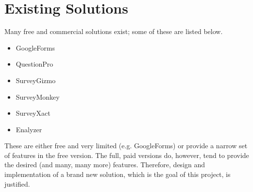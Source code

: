 \section{Existing Solutions}
\label{sec:existingsolutions}
Many free and commercial solutions exist; some of these are listed below.
\begin{itemize}
\item GoogleForms
\item QuestionPro
\item SurveyGizmo
\item SurveyMonkey
\item SurveyXact
\item Enalyzer
\end{itemize}
  
These are either free and very limited (e.g. GoogleForms) or provide a narrow set of features in the free version. The full, paid versions do, however, tend to provide the desired (and many, many more) features. Therefore, design and implementation of a brand new solution, which is the goal of this project, is justified.
